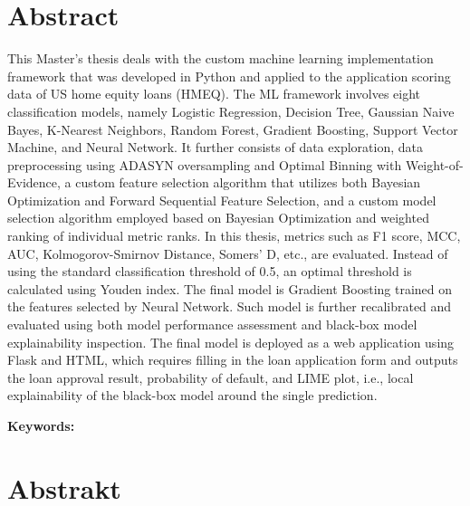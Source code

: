 \section*{Abstract}


This Master's thesis deals with the custom machine learning implementation framework that was developed in Python and applied to the application scoring data of US home equity loans (HMEQ).
The ML framework involves eight classification models, namely Logistic Regression, Decision Tree, Gaussian Naive Bayes, K-Nearest Neighbors, Random Forest, Gradient Boosting, Support Vector Machine, and Neural Network.
It further consists of data exploration, data preprocessing using ADASYN oversampling and Optimal Binning with Weight-of-Evidence, a custom feature selection algorithm that utilizes both Bayesian Optimization and Forward Sequential Feature Selection, and a custom model selection algorithm employed based on Bayesian Optimization and weighted ranking of individual metric ranks. In this thesis, metrics such as F1 score, MCC, AUC, Kolmogorov-Smirnov Distance, Somers' D, etc., are evaluated.
Instead of using the standard classification threshold of 0.5, an optimal threshold is calculated using Youden index.
The final model is Gradient Boosting trained on the features selected by Neural Network. 
Such model is further recalibrated and evaluated using both model performance assessment and black-box model explainability inspection.
The final model is deployed as a web application using Flask and HTML, which requires filling in the loan application form and outputs the loan approval result, probability of default, and LIME plot, i.e., local explainability of the black-box model around the single prediction.
\bigskip

\textbf{Keywords:} \Keywords


\bigskip

\newpage
\section*{Abstrakt}\label{abstract}


